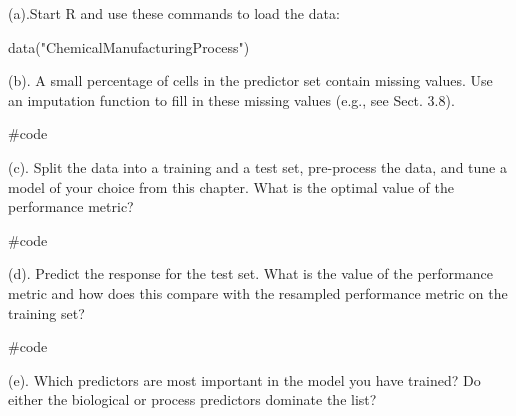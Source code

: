 \documentclass[openany]{report}
\newenvironment{Shaded}{\begin{snugshade}}{\end{snugshade}}
\newcommand{\CommentTok}[1]{\textcolor[rgb]{0.50,0.62,0.50}{#1}}
\newcommand{\KeywordTok}[1]{\textcolor[rgb]{0.94,0.87,0.69}{#1}}
\newcommand{\NormalTok}[1]{\textcolor[rgb]{0.80,0.80,0.80}{#1}}
\newcommand{\StringTok}[1]{\textcolor[rgb]{0.80,0.58,0.58}{#1}}
\begin{document}
\begin{subquestion}{(a).}Start R and use these commands to load the data:
\end{subquestion}

\begin{Shaded}
\begin{Highlighting}[]
\KeywordTok{data}\NormalTok{(}\StringTok{"ChemicalManufacturingProcess"}\NormalTok{)}
\end{Highlighting}
\end{Shaded}

\begin{subquestion}{(b).} A small percentage of cells in the predictor set contain missing values. Use an imputation function to fill in these missing values (e.g., see Sect. 3.8). 
\end{subquestion}

\begin{Shaded}
\begin{Highlighting}[]
\CommentTok{#code}
\end{Highlighting}
\end{Shaded}

\begin{subquestion}{(c).} Split the data into a training and a test set, pre-process the data, and tune a model of your choice from this chapter. What is the optimal value of the performance metric? 
\end{subquestion}

\begin{Shaded}
\begin{Highlighting}[]
\CommentTok{#code}
\end{Highlighting}
\end{Shaded}

\begin{subquestion}{(d).} Predict the response for the test set. What is the value of the performance metric and how does this compare with the resampled performance metric on the training set? 
\end{subquestion}

\begin{Shaded}
\begin{Highlighting}[]
\CommentTok{#code}
\end{Highlighting}
\end{Shaded}

\begin{subquestion}{(e).} Which predictors are most important in the model you have trained? Do either the biological or process predictors dominate the list? 
\end{subquestion}
\end{document}
